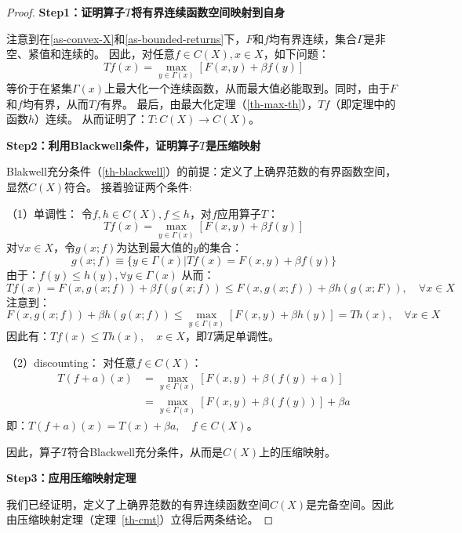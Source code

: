 \begin{proof}
    \textbf{Step1：证明算子$T$将有界连续函数空间映射到自身}

    注意到在\cref{as-convex-X}和\cref{as-bounded-returns}下，$F$和$f$均有界连续，集合$\Gamma$是非空、紧值和连续的。
    因此，对任意$f\in C\left(X\right), x\in X$，如下问题：
    $$Tf\left(x\right)=\max_{y\in\Gamma\left(x\right)}\left[F\left(x,y\right)+\beta f\left(y\right)\right]$$
    等价于在紧集$\Gamma\left(x\right)$上最大化一个连续函数，从而最大值必能取到。同时，由于$F$和$f$均有界，从而$Tf$有界。
    最后，由最大化定理（\cref{th-max-th}），$Tf$（即定理中的函数$h$）连续。
    从而证明了：$T: C\left(X\right)\rightarrow C\left(X\right)$。

    \textbf{Step2：利用Blackwell条件，证明算子$T$是压缩映射}

    Blakwell充分条件（\cref{th-blackwell}）的前提：定义了上确界范数的有界函数空间，显然$C\left(X\right)$符合。
    接着验证两个条件:

    （1）单调性：
    令$f,h \in C\left(X\right), f\leq h$，对$f$应用算子$T$：
    $$Tf\left(x\right)=\max_{y\in \Gamma\left(x\right)}\left[F\left(x,y\right)+\beta f\left(y\right)\right]$$
    对$\forall x\in X$，令$g\left(x;f\right)$为达到最大值的$y$的集合：
    $$
    g\left(x;f\right)\equiv \{y\in\Gamma\left(x\right)|Tf\left(x\right)=F\left(x,y\right)+\beta f\left(y\right)\}
    $$
    由于：$f\left(y\right)\leq h\left(y\right), \forall y\in \Gamma\left(x\right)$
    从而：$$Tf\left(x\right)=F\left(x,g\left(x;f\right)\right)+\beta f\left(g\left(x;f\right)\right)
    \leq F\left(x,g\left(x;f\right)\right)+\beta h\left(g\left(x;F\right)\right), \quad \forall x\in X$$
    注意到：
    $$
    F(x, g(x ; f))+\beta h(g(x ; f)) \leq \max _{y \in \Gamma(x)}[F(x, y)+\beta h(y)]=T h(x), \quad \forall x \in X
    $$
    因此有：$Tf\left(x\right)\leq Th\left(x\right), \quad x\in X$，即$T$满足单调性。
    
    （2）discounting：
    对任意$f\in C\left(X\right)$：
    $$
    \begin{aligned}
        T\left(f+a\right)\left(x\right) &= 
            \max_{y\in\Gamma\left(x\right)}\left[F\left(x,y\right)+\beta \left(f\left(y\right)+a\right)\right]  \\
            &= \max_{y\in\Gamma\left(x\right)}\left[F\left(x,y\right)+\beta \left(f\left(y\right)\right)\right]+\beta a
    \end{aligned}
    $$
    即：$T\left(f+a\right)\left(x\right)=T\left(x\right)+\beta a, \quad f\in C\left(X\right)$。

    因此，算子$T$符合Blackwell充分条件，从而是$C\left(X\right)$上的压缩映射。

    \textbf{Step3：应用压缩映射定理}

    我们已经证明，定义了上确界范数的有界连续函数空间$C(X)$是完备空间。因此由压缩映射定理（定理~\ref{th-cmt}）立得后两条结论。
\end{proof}

